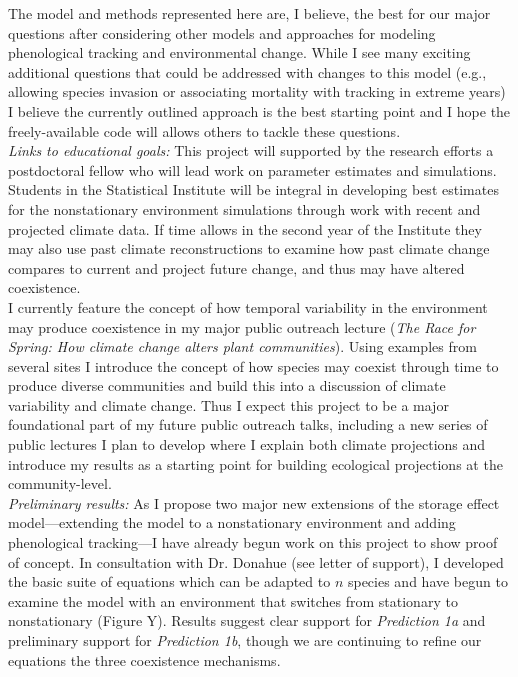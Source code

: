 \documentclass[12pt,a4paper,oneside]{article}
\begin{document}
The model and methods represented here are, I believe, the best for our major questions after considering other models and approaches for modeling phenological tracking and environmental change. While I see many exciting additional questions that could be addressed with changes to this model (e.g., allowing species invasion or associating mortality with tracking in extreme years) I believe the currently outlined approach is the best starting point and I hope the freely-available code will allows others to tackle these questions.  
\vspace{1.5ex}\\
\emph {Links to educational goals:} This project will supported by the research efforts a postdoctoral fellow who will lead work on parameter estimates and simulations. Students in the Statistical Institute will be integral in developing best estimates for the nonstationary environment simulations through work with recent and projected climate data. If time allows in the second year of the Institute they may also use past climate reconstructions to examine how past climate change compares to current and project future change, and thus may have altered coexistence. 
\vspace{1.5ex}\\
I currently feature the concept of how temporal variability in the environment may produce coexistence in my major public outreach lecture (\emph{The Race for Spring: How climate change alters plant communities}). Using examples from several sites I introduce the concept of how species may coexist through time to produce diverse communities and build this into a discussion of climate variability and climate change. Thus I expect this project to be a major foundational part of my future public outreach talks, including a new series of public lectures I plan to develop where I explain both climate projections and introduce my results as a starting point for building ecological projections at the community-level.
\vspace{1.5ex}\\
\emph{Preliminary results:} As I propose two major new extensions of the storage effect model---extending the model to a nonstationary environment and adding phenological tracking---I have already begun work on this project to show proof of concept. In consultation with Dr. Donahue (see letter of support), I developed the basic suite of equations which can be adapted to $n$ species and have begun to examine the model with an environment that switches from stationary to nonstationary (Figure Y). Results suggest clear support for \emph{Prediction 1a} and preliminary support for \emph{Prediction 1b}, though we are continuing to refine our equations the three coexistence mechanisms. 
\end{document}
